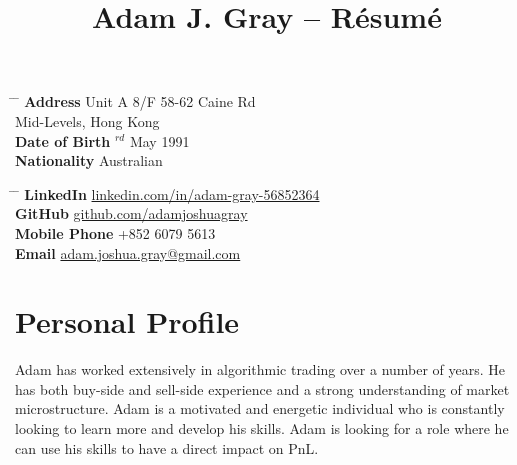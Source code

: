 \documentclass[10pt,hidelinks]{article} %
\begin{document}

\title{Adam J. Gray -- Résumé} %


\parbox{0.5\textwidth}{ %
\begin{tabbing} %
\hspace{3cm} \= \hspace{4cm} \= \kill %
{\bf Address} \> Unit A 8/F 58-62 Caine Rd\\ %
\> Mid-Levels, Hong Kong \\ %
{\bf Date of Birth} $^{rd}$ May 1991 \\ %
{\bf Nationality} \> Australian  %
\end{tabbing}}
\hfill %
\parbox{0.5\textwidth}{ %
\begin{tabbing} %
\hspace{3cm} \= \hspace{4cm} \= \kill %
{\bf LinkedIn } \> \href{https://hk.linkedin.com/in/adam-gray-56852364}{linkedin.com/in/adam-gray-56852364} \\ %
{\bf GitHub } \> \href{https://github.com/adamjoshuagray}{github.com/adamjoshuagray} \\
{\bf Mobile Phone} \> +852 6079 5613 \\ %
{\bf Email} \> \href{mailto:adam.joshua.gray@gmail.com}{adam.joshua.gray@gmail.com} \\ %
\end{tabbing}}


\section{Personal Profile}

Adam has worked extensively in algorithmic trading over a number of years. He has both buy-side and sell-side
experience and a strong understanding of market microstructure. Adam is a motivated and energetic individual who
is constantly looking to learn more and develop his skills. Adam is looking for a role where he can use his skills
to have a direct impact on PnL.
\end{document}
